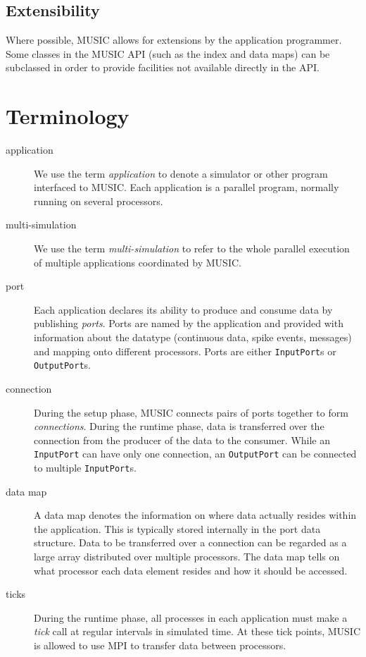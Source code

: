 \documentclass[a4paper,twoside]{report}
\begin{document}
\subsection{Extensibility}

Where possible, MUSIC allows for extensions by the application
programmer.  Some classes in the MUSIC API (such as the index and data
maps) can be subclassed in order to provide facilities not available
directly in the API.


\section{Terminology}

\begin{description}
\item[application] We use the term
  \emph{application} to denote a simulator or other
  program interfaced to MUSIC.  Each application is a parallel
  program, normally running on several processors.

\item[multi-simulation] We use the term
  \emph{multi-simulation} to refer to the
  whole parallel execution of multiple applications coordinated by
  MUSIC.

\item[port] Each application declares its ability to produce and
  consume data by publishing \emph{ports}.  Ports are
  named by the application and provided with information about the
  datatype (continuous data, spike events, messages) and mapping onto
  different processors.  Ports are either
  \lstinline|InputPort|s or
  \lstinline|OutputPort|s.

\item[connection] During the setup phase, MUSIC connects pairs of
  ports together to form \emph{connections}.  During
  the runtime phase, data is transferred over the connection from the
  producer of the data to the consumer.  While an
  \lstinline|InputPort| can have only one connection, an
  \lstinline|OutputPort| can be connected to multiple
  \lstinline|InputPort|s.

\item[data map] A data map denotes the information on
  where data actually resides within the application.  This is
  typically stored internally in the port data structure.  Data to be
  transferred over a connection can be regarded as a large array
  distributed over multiple processors.  The data map tells on
  what processor each data element resides and how it should be
  accessed.

\item[ticks] During the runtime phase, all processes in each
  application must make a \emph{tick} call at regular
  intervals in simulated time.  At these tick points, MUSIC is allowed
  to use MPI to transfer data between processors.
\end{description}
\end{document}
